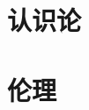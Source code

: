 \documentclass[UTF8]{RepresentationUniverse}
\begin{document}

\section{认识论}

\section{伦理}
\end{document}
